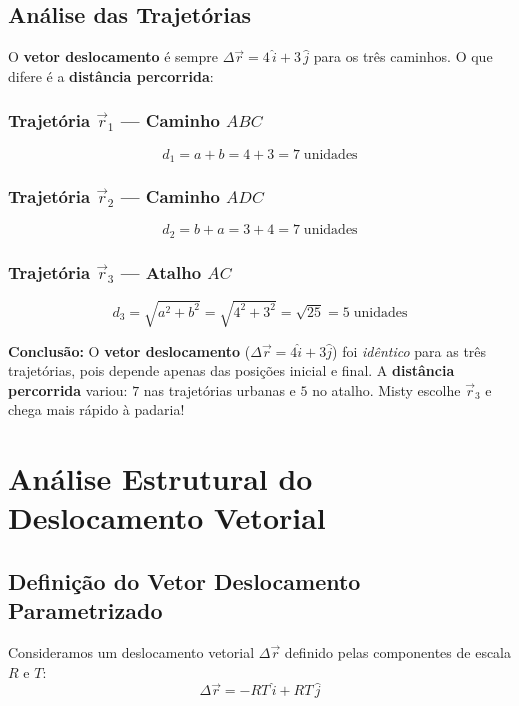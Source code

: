 \documentclass[10.5pt, a4paper]{extarticle}
\begin{document}
\subsection{Análise das Trajetórias}

O \textbf{vetor deslocamento} é sempre $\Delta\vec{r} = 4\,\hat{i} + 3\,\hat{j}$ para os três caminhos. O que difere é a \textbf{distância percorrida}:

\subsubsection{Trajetória $\vec{r}_1$ — Caminho $ABC$}
\[
  d_1 = a + b = 4 + 3 = 7\;\text{unidades}
\]

\subsubsection{Trajetória $\vec{r}_2$ — Caminho $ADC$}
\[
  d_2 = b + a = 3 + 4 = 7\;\text{unidades}
\]

\subsubsection{Trajetória $\vec{r}_3$ — Atalho $AC$}
\[
  d_3 = \sqrt{a^2 + b^2} = \sqrt{4^2 + 3^2} = \sqrt{25} = 5\;\text{unidades}
\]

\begin{squirtlebox}
\textbf{Conclusão:} O \textbf{vetor deslocamento} ($\Delta\vec{r} = 4\hat{i}+3\hat{j}$) foi \textit{idêntico} para as três trajetórias, pois depende apenas das posições inicial e final. A \textbf{distância percorrida} variou: $7$ nas trajetórias urbanas e $5$ no atalho. Misty escolhe $\vec{r}_3$ e chega mais rápido à padaria!
\end{squirtlebox}

\section{Análise Estrutural do Deslocamento Vetorial}

\subsection{Definição do Vetor Deslocamento Parametrizado}

Consideramos um deslocamento vetorial $\Delta\vec{r}$ definido pelas componentes de escala $R$ e $T$:
\begin{equation}
  \Delta\vec{r} = -RT\,\hat{i} + RT\,\hat{j}
\end{equation}
\end{document}

